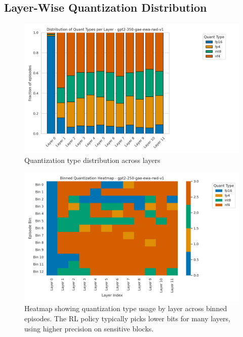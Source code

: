 \documentclass{article}
\begin{document}
	\subsection{Layer-Wise Quantization Distribution}
	\begin{figure}[ht]
		\centering
		\includegraphics[width=0.93\columnwidth]{gpt2-350-gae-ewa-rwd-v1_quant_dist_bar.png}
		\vspace{-0.4em}
		\caption{\small Quantization type distribution across layers}
		\label{fig:bardist}
		\vspace{-0.5em}
	\end{figure}
	\begin{figure}[ht]
		\centering
		\includegraphics[width=0.93\columnwidth]{gpt2-250-gae-ewa-rwd-v1_quant_heatmap_binned.png}
		\vspace{-0.4em}
		\caption{\small Heatmap showing quantization type usage by layer across binned episodes. The RL policy typically picks lower bits for many layers, using higher precision on sensitive blocks.}
		\label{fig:bin_heatmap}
		\vspace{-0.5em}
	\end{figure}
\end{document}
